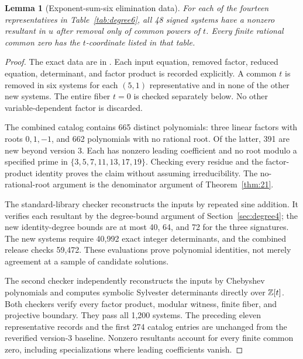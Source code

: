 \documentclass[11pt]{article}
\newtheorem{lemma}[theorem]{Lemma}
\theoremstyle{definition}\newtheorem{definition}[theorem]{Definition}
\theoremstyle{remark}\newtheorem{remark}[theorem]{Remark}
\begin{document}
\begin{lemma}[Exponent-sum-six elimination data]\label{lem:degree6data}
For each of the fourteen representatives in Table~\ref{tab:degree6}, all 48 signed systems have a nonzero resultant in $u$ after removal only of common powers of $t$. Every finite rational common zero has the $t$-coordinate listed in that table.
\end{lemma}
\begin{proof}
The exact data are in . Each input equation, removed factor, reduced equation, determinant, and factor product is recorded explicitly. A common $t$ is removed in six systems for each $(5,1)$ representative and in none of the other new systems. The entire fiber $t=0$ is checked separately below. No other variable-dependent factor is discarded.

The combined catalog contains 665 distinct polynomials: three linear factors with roots $0,1,-1$, and 662 polynomials with no rational root. Of the latter, 391 are new beyond version 3. Each has nonzero leading coefficient and no root modulo a specified prime in $\{3,5,7,11,13,17,19\}$. Checking every residue and the factor-product identity proves the claim without assuming irreducibility. The no-rational-root argument is the denominator argument of Theorem~\ref{thm:21}.

The standard-library checker reconstructs the inputs by repeated sine addition. It verifies each resultant by the degree-bound argument of Section~\ref{sec:degree4}; the new identity-degree bounds are at most 40, 64, and 72 for the three signatures. The new systems require 40,992 exact integer determinants, and the combined release checks 59,472. These evaluations prove polynomial identities, not merely agreement at a sample of candidate solutions.

The second checker independently reconstructs the inputs by Chebyshev polynomials and computes symbolic Sylvester determinants directly over $\mathbb Z[t]$. Both checkers verify every factor product, modular witness, finite fiber, and projective boundary. They pass all 1,200 systems. The preceding eleven representative records and the first 274 catalog entries are unchanged from the reverified version-3 baseline. Nonzero resultants account for every finite common zero, including specializations where leading coefficients vanish.
\end{proof}
\end{document}
